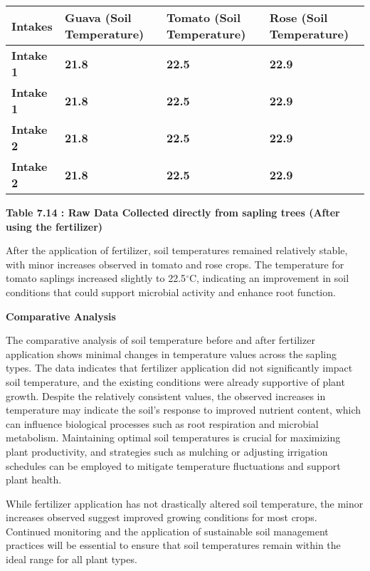 \documentclass{book} %
\begin{document}
\begin{tabular}{|p{0.7in}|p{0.7in}|p{0.7in}|p{0.7in}|} \hline 
\textbf{Intakes} & \textbf{Guava (Soil Temperature)} & \textbf{Tomato (Soil Temperature)} & \textbf{Rose (Soil Temperature)} \\ \hline 
\textbf{Intake 1} & \textbf{21.8} & \textbf{22.5} & \textbf{22.9} \\ \hline 
\textbf{Intake 1} & \textbf{21.8} & \textbf{22.5} & \textbf{22.9} \\ \hline 
\textbf{Intake 2} & \textbf{21.8} & \textbf{22.5} & \textbf{22.9} \\ \hline 
\textbf{Intake 2} & \textbf{21.8} & \textbf{22.5} & \textbf{22.9} \\ \hline 
\end{tabular}

\textbf{Table 7.14 : Raw Data Collected directly from sapling trees (After using the fertilizer)}

\noindent After the application of fertilizer, soil temperatures remained relatively stable, with minor increases observed in tomato and rose crops. The temperature for tomato saplings increased slightly to 22.5$\mathrm{{}^\circ}$C, indicating an improvement in soil conditions that could support microbial activity and enhance root function.

\noindent \textbf{Comparative Analysis}

\noindent The comparative analysis of soil temperature before and after fertilizer application shows minimal changes in temperature values across the sapling types. The data indicates that fertilizer application did not significantly impact soil temperature, and the existing conditions were already supportive of plant growth. Despite the relatively consistent values, the observed increases in temperature may indicate the soil's response to improved nutrient content, which can influence biological processes such as root respiration and microbial metabolism. Maintaining optimal soil temperatures is crucial for maximizing plant productivity, and strategies such as mulching or adjusting irrigation schedules can be employed to mitigate temperature fluctuations and support plant health.

\noindent While fertilizer application has not drastically altered soil temperature, the minor increases observed suggest improved growing conditions for most crops. Continued monitoring and the application of sustainable soil management practices will be essential to ensure that soil temperatures remain within the ideal range for all plant types.
\end{document}
